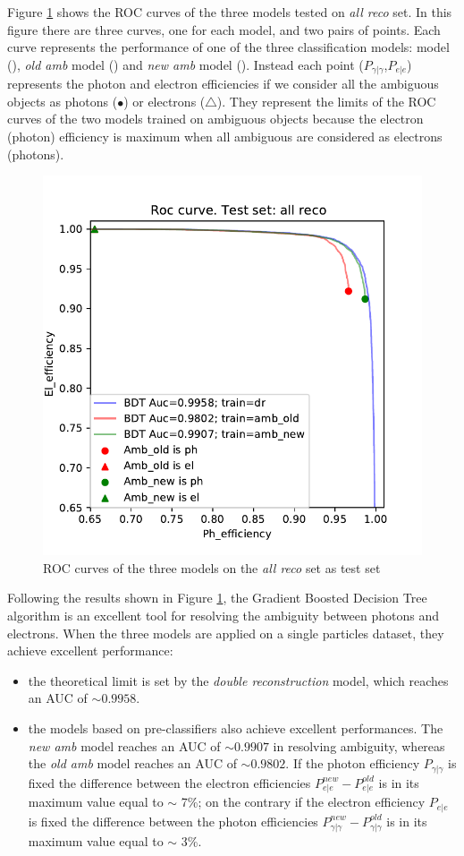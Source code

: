 \documentclass[a4paper, oneside, 11pt, openright]{book}
\begin{document}
			Figure \ref{fig:last_roc} shows the ROC curves of the three models tested on \textit{all reco} set. In this figure there are three curves, one for each model, and two pairs of points. Each curve represents the performance of one of the three classification models:  model ({\color{blue}{--}}), \textit{old amb} model ({\color{red}{--}}) and \textit{new amb} model ({\color{green}{--}}). Instead each point ($P_{\gamma|\gamma}$,$P_{e|e}$) represents the photon and electron efficiencies if we consider all the ambiguous objects as photons ($\bullet$) or electrons ($\triangle$). They represent the limits of the ROC curves of the two models trained on ambiguous objects because the electron (photon) efficiency is maximum when all ambiguous are considered as electrons (photons).
			
			\begin{figure}
				\centering
				\includegraphics[width=.65\linewidth]{tesi_images/all_amb_roc.pdf} 
				\caption{ROC curves of the three models on the \textit{all reco} set as test set} 
				\label{fig:last_roc}
			\end{figure}
		
			Following the results shown in Figure \ref{fig:last_roc}, the Gradient Boosted Decision Tree algorithm is an excellent tool for resolving the ambiguity between photons and electrons. When the three models are applied on a single particles dataset, they achieve excellent performance: 
			\begin{itemize}
				\item the theoretical limit is set by the \textit{double reconstruction} model, which reaches an AUC of $\sim0.9958$.
				\item the models based on pre-classifiers also achieve excellent performances. The \textit{new amb} model reaches an AUC of $\sim0.9907$ in resolving ambiguity, whereas the \textit{old amb} model reaches an AUC of $\sim0.9802$. If the photon efficiency $P_{\gamma|\gamma}$ is fixed the difference between the electron efficiencies $P_{e|e}^{new} - P_{e|e}^{old}$ is in its maximum value equal to $\sim$ 7\%; on the contrary if the electron efficiency $P_{e|e}$ is fixed the difference between the photon efficiencies $P_{\gamma|\gamma}^{new} - P_{\gamma|\gamma}^{old}$ is in its maximum value equal to $\sim$ 3\%.
			\end{itemize}
		  
\end{document}
